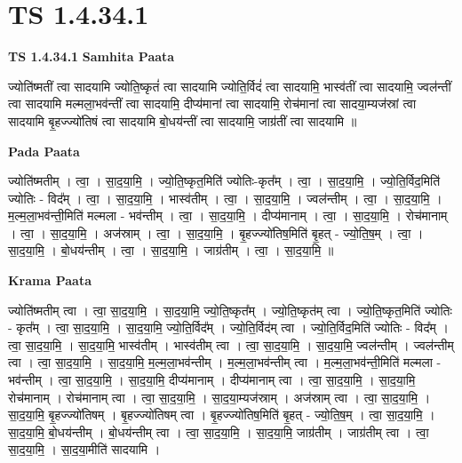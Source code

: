 \documentclass[17pt]{extarticle}
\begin{document}
\section*{ TS 1.4.34.1 }

\textbf{TS 1.4.34.1 } \newline
\textbf{Samhita Paata} \newline

ज्योति॑ष्मतीं त्वा सादयामि ज्योति॒ष्कृतं॑ त्वा सादयामि ज्योति॒र्विदं॑ त्वा सादयामि॒ भास्व॑तीं त्वा सादयामि॒ ज्वल॑न्तीं त्वा सादयामि मल्मला॒भव॑न्तीं त्वा सादयामि॒ दीप्य॑मानां त्वा सादयामि॒ रोच॑मानां त्वा सादया॒म्यज॑स्रां त्वा सादयामि बृ॒हज्ज्यो॑तिषं त्वा सादयामि बो॒धय॑न्तीं त्वा सादयामि॒ जाग्र॑तीं त्वा सादयामि ॥ \newline

\textbf{Pada Paata} \newline

ज्योति॑ष्मतीम् । त्वा॒ । सा॒द॒या॒मि॒ । ज्यो॒ति॒ष्कृत॒मिति॑ ज्योतिः-कृत᳚म् । त्वा॒ । सा॒द॒या॒मि॒ । ज्यो॒ति॒र्विद॒मिति॑ ज्योतिः - विद᳚म् । त्वा॒ । सा॒द॒या॒मि॒ । भास्व॑तीम् । त्वा॒ । सा॒द॒या॒मि॒ । ज्वल॑न्तीम् । त्वा॒ । सा॒द॒या॒मि॒ । म॒ल्म॒ला॒भव॑न्ती॒मिति॑ मल्मला - भव॑न्तीम् । त्वा॒ । सा॒द॒या॒मि॒ । दीप्य॑मानाम् । त्वा॒ । सा॒द॒या॒मि॒ । रोच॑मानाम् । त्वा॒ । सा॒द॒या॒मि॒ । अज॑स्राम् । त्वा॒ । सा॒द॒या॒मि॒ । बृ॒हज्ज्यो॑तिष॒मिति॑ बृ॒हत् - ज्यो॒ति॒ष॒म् । त्वा॒ । सा॒द॒या॒मि॒ । बो॒धय॑न्तीम् । त्वा॒ । सा॒द॒या॒मि॒ । जाग्र॑तीम् । त्वा॒ । सा॒द॒या॒मि॒ ॥  \newline


\textbf{Krama Paata} \newline

ज्योति॑ष्मतीम् त्वा । त्वा॒ सा॒द॒या॒मि॒ । सा॒द॒या॒मि॒ ज्यो॒ति॒ष्कृत᳚म् । ज्यो॒ति॒ष्कृत॑म् त्वा । ज्यो॒ति॒ष्कृत॒मिति॑ ज्योतिः - कृत᳚म् । त्वा॒ सा॒द॒या॒मि॒ । सा॒द॒या॒मि॒ ज्यो॒ति॒र्विद᳚म् । ज्यो॒ति॒र्विद॑म् त्वा । ज्यो॒ति॒र्विद॒मिति॑ ज्योतिः - विद᳚म् । त्वा॒ सा॒द॒या॒मि॒ । सा॒द॒या॒मि॒ भास्व॑तीम् । भास्व॑तीम् त्वा । त्वा॒ सा॒द॒या॒मि॒ । सा॒द॒या॒मि॒ ज्वल॑न्तीम् । ज्वल॑न्तीम् त्वा । त्वा॒ सा॒द॒या॒मि॒ । सा॒द॒या॒मि॒ म॒ल्म॒ला॒भव॑न्तीम् । म॒ल्म॒ला॒भव॑न्तीम् त्वा । म॒ल्म॒ला॒भव॑न्ती॒मिति॑ मल्मला - भव॑न्तीम् । त्वा॒ सा॒द॒या॒मि॒ । सा॒द॒या॒मि॒ दीप्य॑मानाम् । दीप्य॑मानाम् त्वा । त्वा॒ सा॒द॒या॒मि॒ । सा॒द॒या॒मि॒ रोच॑मानाम् । रोच॑मानाम् त्वा । त्वा॒ सा॒द॒या॒मि॒ । सा॒द॒या॒म्यज॑स्राम् । अज॑स्राम् त्वा । त्वा॒ सा॒द॒या॒मि॒ । सा॒द॒या॒मि॒ बृ॒हज्ज्यो॑तिषम् । बृ॒हज्ज्यो॑तिषम् त्वा । बृ॒हज्ज्यो॑तिष॒मिति॑ बृ॒हत् - ज्यो॒ति॒ष॒म् । त्वा॒ सा॒द॒या॒मि॒ । सा॒द॒या॒मि॒ बो॒धय॑न्तीम् । बो॒धय॑न्तीम् त्वा । त्वा॒ सा॒द॒या॒मि॒ । सा॒द॒या॒मि॒ जाग्र॑तीम् । जाग्र॑तीम् त्वा । त्वा॒ सा॒द॒या॒मि॒ । सा॒द॒या॒मीति॑ सादयामि । \newline
\end{document}
